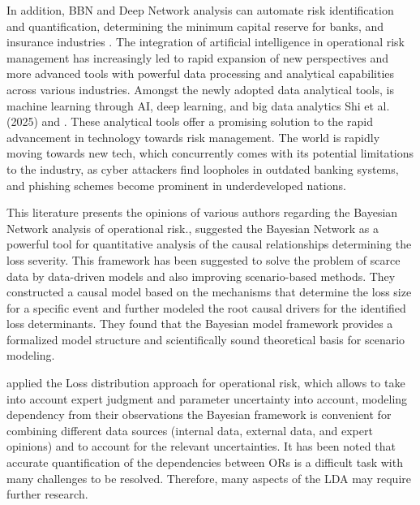 In addition, BBN and Deep Network analysis can automate risk identification and quantification, determining the minimum capital reserve for banks, and insurance industries \parencite{buddiga_advancing_2022}. The integration of artificial intelligence in operational risk management has increasingly led to rapid expansion of new perspectives and more advanced tools with powerful data processing and analytical capabilities across various industries. Amongst the newly adopted data analytical tools, is machine learning through AI, deep learning, and big data analytics Shi et al.(2025) and \textcite{feng2024deep}. These analytical tools offer a promising solution to the rapid advancement in technology towards risk management. The world is rapidly moving towards new tech, which concurrently comes with its potential limitations to the industry, as cyber attackers find loopholes in outdated banking systems, and phishing schemes become prominent in underdeveloped nations.

This literature presents the opinions of various authors regarding the Bayesian Network analysis of operational risk.\textcite{hager_knowledge_2010}, suggested the Bayesian Network as a powerful tool for quantitative analysis of the causal relationships determining the loss severity. This framework has been suggested to solve the problem of scarce data by data-driven models and also improving scenario-based methods. They constructed a causal model based on the mechanisms that determine the loss size for a specific event and further modeled the root causal drivers for the identified loss determinants. They found that the Bayesian model framework provides a formalized model structure and scientifically sound theoretical basis for scenario modeling.


\textcite{shevchenko2009implementing} applied the Loss distribution approach for operational risk, which allows to take into account expert judgment and parameter uncertainty into account, modeling dependency from their observations the Bayesian framework is convenient for combining different data sources (internal data, external data, and expert opinions) and to account for the relevant uncertainties. It has been noted that accurate quantification of the dependencies between ORs is a difficult task with many challenges to be resolved. Therefore, many aspects of the LDA may require further research. 

